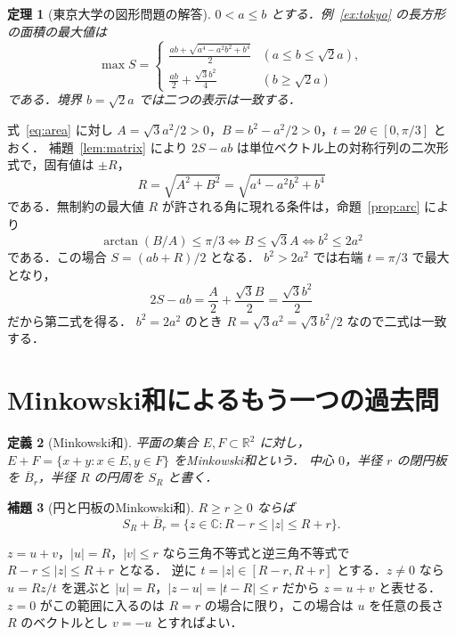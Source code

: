 \documentclass[a5paper,10pt,onecolumn]{jsarticle}
\makeatletter
\theoremstyle{mathnotetheorem}
\newtheorem{theorem}{定理}[section]
\newtheorem{definition}[theorem]{定義}
\newtheorem{lemma}[theorem]{補題}
\renewcommand{\proofname}{証明}
\renewenvironment{proof}[1][\proofname]{%
  \par\pushQED{\qed}\normalfont\topsep4\p@\@plus2\p@\relax
  \trivlist\item[\hskip\labelsep\bfseries #1]\ignorespaces
}{\popQED\endtrivlist\@endpefalse}
\makeatother
\begin{document}
\begin{theorem}[東京大学の図形問題の解答]\label{thm:tokyo}
$0<a\le b$ とする．例~\ref{ex:tokyo} の長方形の面積の最大値は
\begin{equation}\label{eq:answer}
 \max S=\begin{cases}
 \displaystyle\frac{ab+\sqrt{a^4-a^2b^2+b^4}}{2}&(a\le b\le\sqrt2a),\\[4pt]
 \displaystyle\frac{ab}{2}+\frac{\sqrt3 b^2}{4}&(b\ge\sqrt2a)
 \end{cases}
\end{equation}
である．境界 $b=\sqrt2a$ では二つの表示は一致する．
\end{theorem}
\begin{proof}
式~\eqref{eq:area} に対し
$A=\sqrt3a^2/2>0$，$B=b^2-a^2/2>0$，$t=2\theta\in[0,\pi/3]$ とおく．
補題~\ref{lem:matrix} により $2S-ab$ は単位ベクトル上の対称行列の二次形式で，固有値は $\pm R$，
\[
 R=\sqrt{A^2+B^2}=\sqrt{a^4-a^2b^2+b^4}
\]
である．無制約の最大値 $R$ が許される角に現れる条件は，命題~\ref{prop:arc} により
\[
 \arctan(B/A)\le\pi/3
 \iff B\le\sqrt3 A\iff b^2\le2a^2
\]
である．この場合 $S=(ab+R)/2$ となる．
$b^2>2a^2$ では右端 $t=\pi/3$ で最大となり，
\[
 2S-ab=\frac A2+\frac{\sqrt3B}{2}=\frac{\sqrt3b^2}{2}
\]
だから第二式を得る．
$b^2=2a^2$ のとき $R=\sqrt3a^2=\sqrt3b^2/2$ なので二式は一致する．
\end{proof}

\section{Minkowski和によるもう一つの過去問}
\begin{definition}[Minkowski和]
平面の集合 $E,F\subset\mathbb R^2$ に対し，$E+F=\{x+y:x\in E,y\in F\}$ をMinkowski和という．
中心 $0$，半径 $r$ の閉円板を $\overline B_r$，半径 $R$ の円周を $S_R$ と書く．
\end{definition}

\begin{lemma}[円と円板のMinkowski和]\label{lem:annulus}
$R\ge r\ge0$ ならば
\[
 S_R+\overline B_r=\{z\in\mathbb C:R-r\le|z|\le R+r\}.
\]
\end{lemma}
\begin{proof}
$z=u+v$，$|u|=R$，$|v|\le r$ なら三角不等式と逆三角不等式で $R-r\le|z|\le R+r$ となる．
逆に $t=|z|\in[R-r,R+r]$ とする．$z\ne0$ なら $u=Rz/t$ を選ぶと $|u|=R$，$|z-u|=|t-R|\le r$ だから $z=u+v$ と表せる．
$z=0$ がこの範囲に入るのは $R=r$ の場合に限り，この場合は $u$ を任意の長さ $R$ のベクトルとし $v=-u$ とすればよい．
\end{proof}
\end{document}

